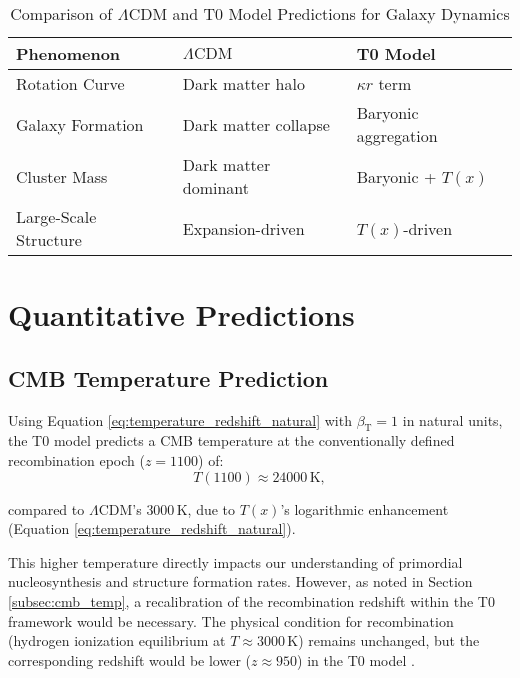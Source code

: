 \documentclass[12pt,a4paper]{article}
\newcommand{\Tfield}{T(x)}
\newcommand{\betaT}{\beta_{\text{T}}}
\newcommand{\LCDM}{\Lambda\text{CDM}}
\begin{document}
	\begin{table}[H]
		\centering
		\caption{Comparison of \(\LCDM\) and T0 Model Predictions for Galaxy Dynamics}
		\label{tab:galaxy_dynamics_comparison}
		\begin{tabular}{p{} p{} p{}}
			\hline
			\textbf{Phenomenon} & \textbf{\(\LCDM\)} & \textbf{T0 Model} \\
			\hline
			Rotation Curve & Dark matter halo & \(\kappa r\) term \\
			Galaxy Formation & Dark matter collapse & Baryonic aggregation \\
			Cluster Mass & Dark matter dominant & Baryonic + \(\Tfield\) \\
			Large-Scale Structure & Expansion-driven & \(\Tfield\)-driven \\
			\hline
		\end{tabular}
	\end{table}
	
	\section{Quantitative Predictions}
	\label{sec:predictions}
	
	\subsection{CMB Temperature Prediction}
	\label{subsec:cmb_temp_prediction}
	
	Using Equation \ref{eq:temperature_redshift_natural} with \(\betaT = 1\) in natural units, the T0 model predicts a CMB temperature at the conventionally defined recombination epoch (\(z = 1100\)) of:
	\begin{equation}
		T(1100) \approx 24000 \, \text{K},
		\label{eq:cmb_temp_t0}
	\end{equation}
	
	compared to \(\LCDM\)'s \(3000 \, \text{K}\), due to \(\Tfield\)'s logarithmic enhancement (Equation \ref{eq:temperature_redshift_natural}).
	
	This higher temperature directly impacts our understanding of primordial nucleosynthesis and structure formation rates. However, as noted in Section \ref{subsec:cmb_temp}, a recalibration of the recombination redshift within the T0 framework would be necessary. The physical condition for recombination (hydrogen ionization equilibrium at \(T \approx 3000 \, \text{K}\)) remains unchanged, but the corresponding redshift would be lower (\(z \approx 950\)) in the T0 model \cite{pascher_temp_2025}.
	
\end{document}

